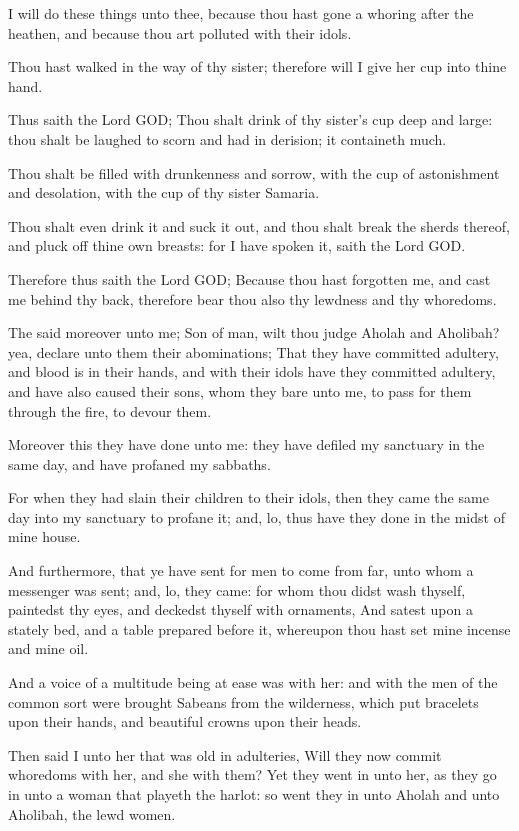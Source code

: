 \Verse I will do these things unto thee, because thou hast gone a whoring after the heathen, and because thou art polluted with their idols.

\Verse Thou hast walked in the way of thy sister; therefore will I give her cup into thine hand.

\Verse Thus saith the Lord GOD; Thou shalt drink of thy sister's cup deep and large: thou shalt be laughed to scorn and had in derision; it containeth much.

\Verse Thou shalt be filled with drunkenness and sorrow, with the cup of astonishment and desolation, with the cup of thy sister Samaria.

\Verse Thou shalt even drink it and suck it out, and thou shalt break the sherds thereof, and pluck off thine own breasts: for I have spoken it, saith the Lord GOD.

\Verse Therefore thus saith the Lord GOD; Because thou hast forgotten me, and cast me behind thy back, therefore bear thou also thy lewdness and thy whoredoms.

\Verse The \LORD said moreover unto me; Son of man, wilt thou judge Aholah and Aholibah? yea, declare unto them their abominations; \Verse That they have committed adultery, and blood is in their hands, and with their idols have they committed adultery, and have also caused their sons, whom they bare unto me, to pass for them through the fire, to devour them.

\Verse Moreover this they have done unto me: they have defiled my sanctuary in the same day, and have profaned my sabbaths.

\Verse For when they had slain their children to their idols, then they came the same day into my sanctuary to profane it; and, lo, thus have they done in the midst of mine house.

\Verse And furthermore, that ye have sent for men to come from far, unto whom a messenger was sent; and, lo, they came: for whom thou didst wash thyself, paintedst thy eyes, and deckedst thyself with ornaments, \Verse And satest upon a stately bed, and a table prepared before it, whereupon thou hast set mine incense and mine oil.

\Verse And a voice of a multitude being at ease was with her: and with the men of the common sort were brought Sabeans from the wilderness, which put bracelets upon their hands, and beautiful crowns upon their heads.

\Verse Then said I unto her that was old in adulteries, Will they now commit whoredoms with her, and she with them?  \Verse Yet they went in unto her, as they go in unto a woman that playeth the harlot: so went they in unto Aholah and unto Aholibah, the lewd women.

